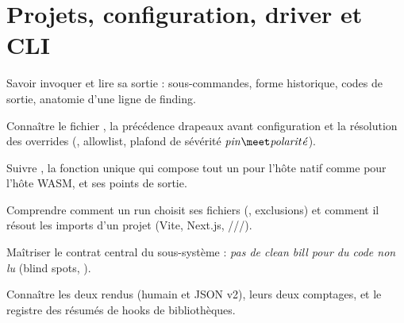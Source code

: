 \chapter{Projets, configuration, driver et CLI}
\label{chap:projet-cli-driver}

\begin{objectifs}
  \item Savoir invoquer \reactant{} et lire sa sortie : sous-commandes, forme historique, codes de sortie, anatomie d'une ligne de finding.
  \item Connaître le fichier , la précédence \og drapeaux avant configuration\fg{} et la résolution des overrides (, allowlist, plafond de sévérité $\mathit{pin} \meet \mathit{polarit\acute{e}}$).
  \item Suivre , la fonction unique qui compose tout un  pour l'hôte natif comme pour l'hôte WASM, et ses points de sortie.
  \item Comprendre comment un run choisit ses fichiers (, exclusions) et comment il résout les imports d'un projet (Vite, Next.js,  ///).
  \item Maîtriser le contrat central du sous-système : \emph{pas de \og clean bill\fg{} pour du code non lu} (blind spots, ).
  \item Connaître les deux rendus (humain et JSON v2), leurs deux comptages, et le registre des résumés de hooks de bibliothèques.
\end{objectifs}


